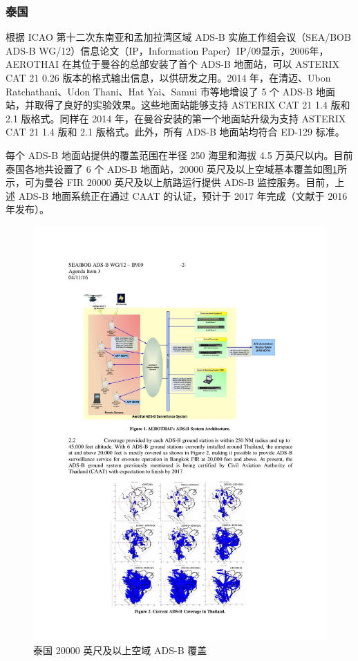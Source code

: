 \subsubsection{泰国}

根据 ICAO 第十二次东南亚和孟加拉湾区域 ADS-B 实施工作组会议（SEA/BOB ADS-B WG/12）信息论文（IP，Information Paper）IP/09显示，2006年，AEROTHAI 在其位于曼谷的总部安装了首个 ADS-B 地面站，可以 ASTERIX CAT 21 0.26 版本的格式输出信息，以供研发之用。2014 年，在清迈、Ubon Ratchathani、Udon Thani、Hat Yai、Samui 市等地增设了 5 个 ADS-B 地面站，并取得了良好的实验效果。这些地面站能够支持 ASTERIX CAT 21 1.4 版和 2.1 版格式。同样在 2014 年，在曼谷安装的第一个地面站升级为支持 ASTERIX CAT 21 1.4 版和 2.1 版格式。此外，所有 ADS-B 地面站均符合 ED-129 标准。

每个 ADS-B 地面站提供的覆盖范围在半径 250 海里和海拔 4.5 万英尺以内。目前泰国各地共设置了 6 个 ADS-B 地面站，20000 英尺及以上空域基本覆盖如图\ref{fig:thailand}所示，可为曼谷 FIR 20000 英尺及以上航路运行提供 ADS-B 监控服务。目前，上述 ADS-B 地面系统正在通过 \acs{CAAT} 的认证，预计于 2017 年完成（文献于 2016 年发布）。

\begin{figure}[!htb]
\centering
\includegraphics[width=14cm]{pic/thailand.pdf}
\caption{泰国 20000 英尺及以上空域 ADS-B 覆盖\protect\footnotemark}
\label{fig:thailand}
\end{figure}

